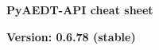 \documentclass[9pt,landscape]{article}
\begin{document}
\footnotesize
\justifying
\begin{center}
     \Huge{\textbf{PyAEDT-API cheat sheet}} \\
\end{center}
\begin{center}
\small{\textbf{Version: 0.6.78 (stable)}} \\
\end{center}
\vspace{-0.15cm}
\noindent\makebox[\linewidth]{\rule{\paperwidth}{2pt}}
\end{document}
